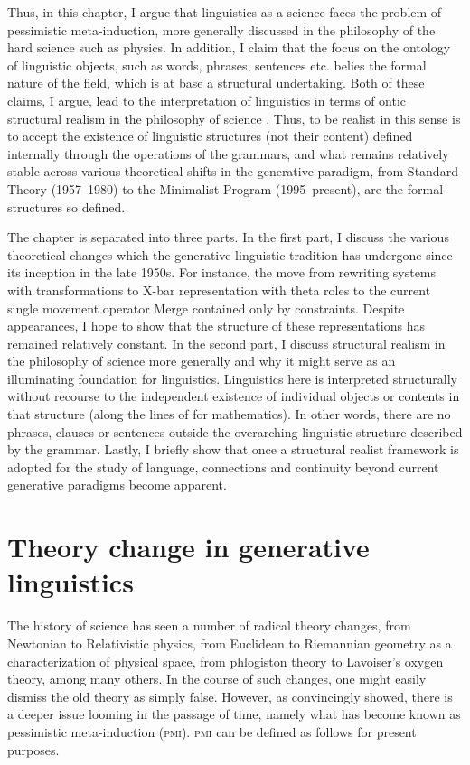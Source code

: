 \documentclass[output=paper]{langscibook}
\begin{document}
Thus, in this chapter, I argue that linguistics as a science faces the problem of pessimistic meta-induction, more generally discussed in the philosophy of the hard science such as physics. In addition, I claim that the focus on the ontology of linguistic objects, such as words, phrases, sentences etc. belies the formal nature of the field, which is at base a structural undertaking. Both of these claims, I argue, lead to the interpretation of linguistics in terms of ontic structural realism in the philosophy of science \citep{Ladyman1998, French2006}. Thus, to be realist in this sense is to accept the existence of linguistic structures (not their content) defined internally through the operations of the grammars, and what remains relatively stable across various theoretical shifts in the generative paradigm, from Standard Theory (1957--1980) to the Minimalist Program (1995--present), are the formal structures so defined. 

The chapter is separated into three parts. In the first part, I discuss the various theoretical changes which the generative linguistic tradition has undergone since its inception in the late 1950s. For instance, the move from rewriting systems with transformations to X-bar representation \citep{Chomsky1970} with theta roles to the current single movement operator Merge contained only by constraints. Despite appearances, I hope to show that the structure of these representations has remained relatively constant. In the second part, I discuss structural realism in the philosophy of science more generally and why it might serve as an illuminating foundation for linguistics. Linguistics here is interpreted structurally without recourse to the independent existence of individual objects or contents in that structure (along the lines of \citealt{Shapiro1997} for mathematics). In other words, there are no phrases, clauses or sentences outside the overarching linguistic structure described by the grammar. Lastly, I briefly show that once a structural realist framework is adopted for the study of language, connections and continuity beyond current generative paradigms become apparent.  

\section{Theory change in generative linguistics}
\label{sec:nefdt:theorychange}

The history of science has seen a number of radical theory changes, from Newtonian to Relativistic physics, from Euclidean to Riemannian geometry as a characterization of physical space, from phlogiston theory to Lavoiser's oxygen theory, among many others. In the course of such changes, one might easily dismiss the old theory as simply false. However, as \cite{Laudan1981} convincingly showed, there is a deeper issue looming in the passage of time, namely what has become known as pessimistic meta-induction (\textsc{pmi}). \textsc{pmi} can be defined as follows for present purposes. 
\end{document}
